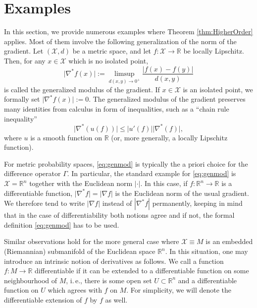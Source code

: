 \documentclass[a4paper,12pt]{amsart}
\numberwithin{equation}{section}
\theoremstyle{remark}
\def\R{{\mathbb R}}
\begin{document}
\section{Examples}\label{sec:Ex1}

In this section, we provide numerous examples where Theorem \ref{thm:HigherOrder} applies. Most of them involve the following generalization of the norm of the gradient. Let $(\mathcal{X},d)$ be a metric space, and let $f \colon \mathcal{X} \to \R$ be locally Lipschitz. Then, for any $x \in \mathcal{X}$ which is no isolated point,
\begin{equation}
	\label{eq:genmod}
	\lvert \nabla^\ast f(x) \rvert := \limsup_{d(x,y) \to 0^+} \frac{|f(x)-f(y)|}{d(x,y)}
\end{equation}
is called the generalized modulus of the gradient. If $x\in\mathcal{X}$ is an isolated point, we formally set $\lvert \nabla^\ast f(x) \rvert:=0$. The generalized modulus of the gradient preserves many identities from calculus in form of inequalities, such as a ``chain rule inequality''
\begin{equation}
	\label{eq:chainrule}
	\lvert \nabla^\ast (u(f)) \rvert \le |u'(f)|\lvert \nabla^\ast(f) \rvert,
\end{equation}
where $u$ is a smooth function on $\R$ (or, more generally, a locally Lipschitz function).

For metric probability spaces, \eqref{eq:genmod} is typically the a priori choice for the difference operator $\Gamma$. In particular, the standard example for \eqref{eq:genmod} is $\mathcal{X}=\R^n$ together with the Euclidean norm $|\cdot|$. In this case, if $f \colon \R^n \to \R$ is a differentiable function, $\lvert \nabla^\ast f \rvert = |\nabla f|$ is the Euclidean norm of the usual gradient. We therefore tend to write $|\nabla f|$ instead of $|\nabla^\ast f|$ permanently, keeping in mind that in the case of differentiability both notions agree and if not, the formal definition \eqref{eq:genmod} has to be used.

Similar observations hold for the more general case where $\mathcal{X} \equiv M$ is an embedded (Riemannian) submanifold of the Euclidean space $\R^n$. In this situation, one may introduce an intrinsic notion of derivatives as follows. We call a function $f \colon M \to \R$ differentiable if it can be extended to a differentiable function on some neighbourhood of $M$, i.\,e., there is some open set $U \subset \R^n$ and a differentiable function on $U$ which agrees with $f$ on $M$. For simplicity, we will denote the differentiable extension of $f$ by $f$ as well.
\end{document}
